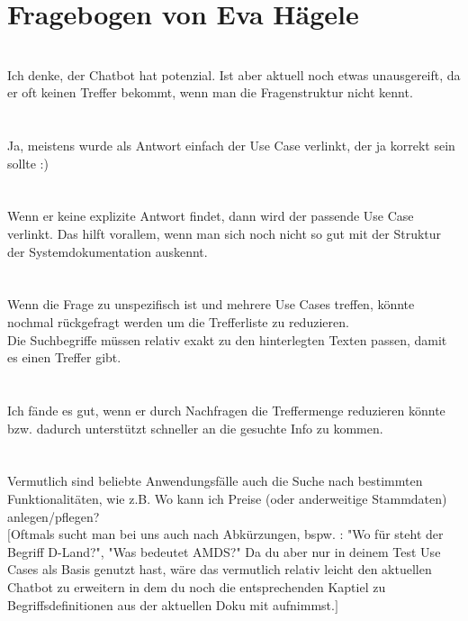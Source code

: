 \section{Fragebogen von Eva Hägele}
\label{ch:evaluation:eva}
\speaker{\frageEins} \\
Ich denke, der Chatbot hat potenzial. Ist aber aktuell noch etwas unausgereift, da er oft keinen Treffer bekommt, wenn man die Fragenstruktur nicht kennt.\\\\
\speaker{\frageZwei} \\
Ja, meistens wurde als Antwort einfach der Use Case verlinkt, der ja korrekt sein sollte :) \\\\
\speaker{\frageDrei} \\
Wenn er keine explizite Antwort findet, dann wird der passende Use Case verlinkt. Das hilft vorallem, wenn man sich noch nicht so gut mit der Struktur der Systemdokumentation auskennt. \\\\
\speaker{\frageVier} \\
Wenn die Frage zu unspezifisch ist und mehrere Use Cases treffen, könnte nochmal rückgefragt werden um die Trefferliste zu reduzieren. \\
Die Suchbegriffe müssen relativ exakt zu den hinterlegten Texten passen, damit es einen Treffer gibt. \\\\
\speaker{\frageFuenf} \\
Ich fände es gut, wenn er durch Nachfragen die Treffermenge reduzieren könnte bzw. dadurch unterstützt schneller an die gesuchte Info zu kommen. \\\\
\speaker{\frageSechs} \\
Vermutlich sind beliebte Anwendungsfälle auch die Suche nach bestimmten Funktionalitäten, wie z.B. Wo kann ich Preise (oder anderweitige Stammdaten) anlegen/pflegen? \\
$[$Oftmals sucht man bei uns auch nach Abkürzungen, bspw. : "Wo für steht der Begriff D-Land?", "Was bedeutet AMDS?" Da du aber nur in deinem Test Use Cases als Basis genutzt hast, wäre das vermutlich relativ leicht den aktuellen Chatbot zu erweitern in dem du noch die entsprechenden Kaptiel zu Begriffsdefinitionen aus der aktuellen Doku mit aufnimmst.$]$ \\\\
\speaker{\frageSieben} \\
